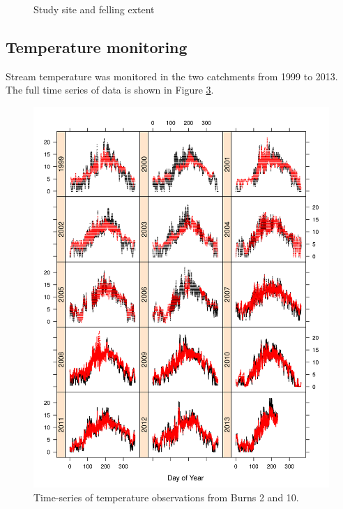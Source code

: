 \begin{figure}
\begin{subfigure}[b]{0.4\textwidth}
    \caption{}
    \label{fig:chptr4:fellingExtent}
  \end{subfigure}
\caption{Study site and felling extent}
\label{fig:chptr4:sitemaps}
\end{figure}





\subsection{Temperature monitoring}

Stream temperature was monitored in the two catchments from 1999 to 2013.  The full time series of data is shown in Figure \ref{fig:chptr4:timeseries}. 

\begin{figure}
  \centering
  \includegraphics[height=0.9\textheight]{dataplot}
\caption{Time-series of temperature observations from Burns 2 and 10.}
\label{fig:chptr4:timeseries}
\end{figure}


